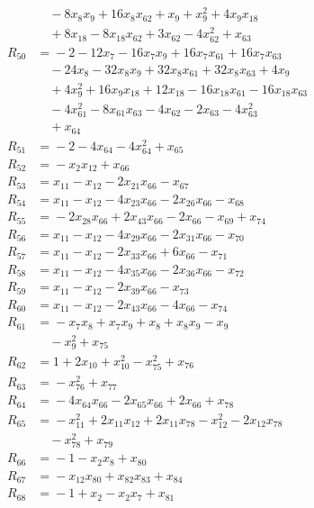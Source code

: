 \begin{align*}
&\quad{} -8x_{8}x_{9} +16x_{8}x_{62} +x_{9} +x_{9}^{2} +4x_{9}x_{18} \\
&\quad{} +8x_{18} -8x_{18}x_{62} +3x_{62} -4x_{62}^{2} +x_{63} \\
R_{50} &={} -2 -12x_{7} -16x_{7}x_{9} +16x_{7}x_{61} +16x_{7}x_{63} \\
&\quad{} -24x_{8} -32x_{8}x_{9} +32x_{8}x_{61} +32x_{8}x_{63} +4x_{9} \\
&\quad{} +4x_{9}^{2} +16x_{9}x_{18} +12x_{18} -16x_{18}x_{61} -16x_{18}x_{63} \\
&\quad{} -4x_{61}^{2} -8x_{61}x_{63} -4x_{62} -2x_{63} -4x_{63}^{2} \\
&\quad{} +x_{64} \\
R_{51} &={} -2 -4x_{64} -4x_{64}^{2} +x_{65} \\
R_{52} &={} -x_{2}x_{12} +x_{66} \\
R_{53} &={} x_{11} -x_{12} -2x_{21}x_{66} -x_{67} \\
R_{54} &={} x_{11} -x_{12} -4x_{23}x_{66} -2x_{26}x_{66} -x_{68} \\
R_{55} &={} -2x_{28}x_{66} +2x_{43}x_{66} -2x_{66} -x_{69} +x_{74} \\
R_{56} &={} x_{11} -x_{12} -4x_{29}x_{66} -2x_{31}x_{66} -x_{70} \\
R_{57} &={} x_{11} -x_{12} -2x_{33}x_{66} +6x_{66} -x_{71} \\
R_{58} &={} x_{11} -x_{12} -4x_{35}x_{66} -2x_{36}x_{66} -x_{72} \\
R_{59} &={} x_{11} -x_{12} -2x_{39}x_{66} -x_{73} \\
R_{60} &={} x_{11} -x_{12} -2x_{43}x_{66} -4x_{66} -x_{74} \\
R_{61} &={} -x_{7}x_{8} +x_{7}x_{9} +x_{8} +x_{8}x_{9} -x_{9} \\
&\quad{} -x_{9}^{2} +x_{75} \\
R_{62} &={} 1 +2x_{10} +x_{10}^{2} -x_{75}^{2} +x_{76} \\
R_{63} &={} -x_{76}^{2} +x_{77} \\
R_{64} &={} -4x_{64}x_{66} -2x_{65}x_{66} +2x_{66} +x_{78} \\
R_{65} &={} -x_{11}^{2} +2x_{11}x_{12} +2x_{11}x_{78} -x_{12}^{2} -2x_{12}x_{78} \\
&\quad{} -x_{78}^{2} +x_{79} \\
R_{66} &={} -1 -x_{2}x_{8} +x_{80} \\
R_{67} &={} -x_{12}x_{80} +x_{82}x_{83} +x_{84} \\
R_{68} &={} -1 +x_{2} -x_{2}x_{7} +x_{81} \\

\end{align*}
